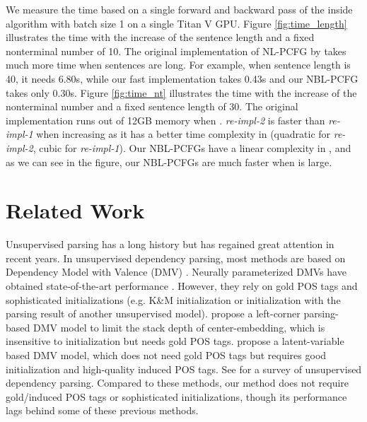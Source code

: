 \documentclass[11pt,a4paper]{article}
\begin{document}
We measure the time based on a single forward and backward pass of the inside algorithm with batch size 1 on a single Titan V GPU.  Figure \ref{fig:time_length} illustrates the time with the increase of the sentence length and a fixed nonterminal number of 10. The original implementation of NL-PCFG by \citet{zhu-etal-2020-return} takes much more time when sentences are long. For example, when sentence length is 40, it needs 6.80s, while our fast implementation takes 0.43s and our NBL-PCFG takes only 0.30s. Figure \ref{fig:time_nt} illustrates the time with the increase of the nonterminal number  and a fixed sentence length of 30. The original implementation runs out of 12GB memory when . \emph{re-impl-2} is faster than \emph{re-impl-1} when increasing  as it has a better time complexity in  (quadratic for \emph{re-impl-2}, cubic for \emph{re-impl-1}). Our NBL-PCFGs have a linear complexity in , and as we can see in the figure, our NBL-PCFGs are much faster when  is large.


\section{Related Work}
Unsupervised parsing has a long history but has regained great attention in recent years. In unsupervised dependency parsing, most methods are based on Dependency Model with Valence (DMV) \cite{klein-manning-2004-corpus}. Neurally parameterized DMVs have obtained state-of-the-art performance \cite{jiang-etal-2016-unsupervised, han-etal-2017-dependency, han-etal-2019-enhancing, yang-etal-2020-second}. However, they rely on gold POS tags and sophisticated initializations (e.g. K\&M initialization or initialization with the parsing result of another unsupervised model). \citet{noji-etal-2016-using} propose a left-corner parsing-based DMV model to limit the stack depth of center-embedding, which is insensitive to initialization but needs gold POS tags. \citet{he-etal-2018-unsupervised} propose a latent-variable based DMV model, which does not need gold POS tags but requires good initialization and high-quality induced POS tags. See \citet{han-etal-2020-survey} for a survey of unsupervised dependency parsing.
Compared to these methods, our method does not require gold/induced POS tags or sophisticated initializations, though its performance lags behind some of these previous methods.  
\end{document}
